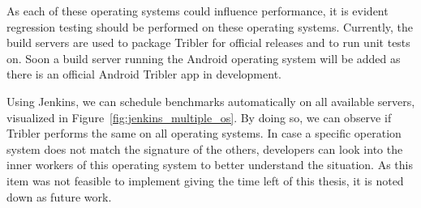 As each of these operating systems could influence performance, it is evident regression testing should be performed on these operating systems.
Currently, the build servers are used to package Tribler for official releases and to run unit tests on.
Soon a build server running the Android operating system will be added as there is an official Android Tribler app in development.

Using Jenkins, we can schedule benchmarks automatically on all available servers, visualized in Figure~\ref{fig:jenkins_multiple_os}.
By doing so, we can observe if Tribler performs the same on all operating systems.
In case a specific operation system does not match the signature of the others, developers can look into the inner workers of this operating system to better understand the situation.
As this item was not feasible to implement giving the time left of this thesis, it is noted down as future work.